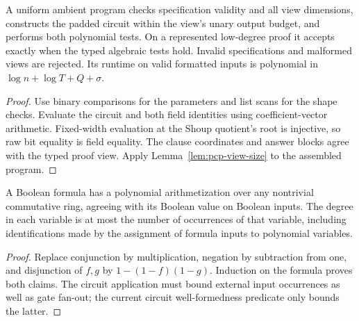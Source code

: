 \begin{lemma}
\label{lem:pcp-executable-tests}
\leanok
A uniform ambient program checks specification validity and all view dimensions,
constructs the padded circuit within the view's unary output budget, and performs
both polynomial tests. On a represented low-degree proof it accepts exactly when
the typed algebraic tests hold. Invalid specifications and malformed views are
rejected. Its runtime on valid formatted inputs is polynomial in
$\log n+\log T+Q+\sigma$.
\end{lemma}
\begin{proof}
\leanok
Use binary comparisons for the parameters and list scans for the shape checks.
Evaluate the circuit and both field identities using coefficient-vector arithmetic.
Fixed-width evaluation at the Shoup quotient's root is injective, so raw bit equality
is field equality. The clause coordinates and answer blocks agree with the typed
proof view. Apply Lemma~\ref{lem:pcp-view-size} to the assembled program.
\end{proof}

\begin{lemma}
\label{lem:pcp-formula-arithmetization}
\leanok
A Boolean formula has a polynomial arithmetization over any nontrivial commutative
ring, agreeing with its Boolean value on Boolean inputs. The degree in each variable
is at most the number of occurrences of that variable, including identifications
made by the assignment of formula inputs to polynomial variables.
\end{lemma}

\begin{proof}
\leanok
Replace conjunction by multiplication, negation by subtraction from one, and
disjunction of $f,g$ by $1-(1-f)(1-g)$. Induction on the formula proves both claims.
The circuit application must bound external input occurrences as well as gate fan-out;
the current circuit well-formedness predicate only bounds the latter.
\end{proof}

